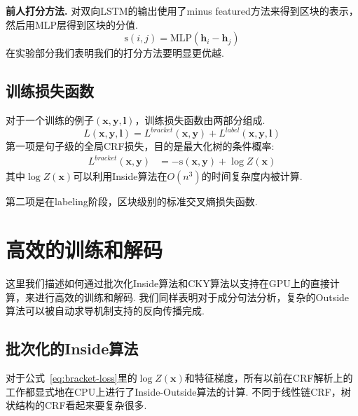 \noindent\textbf{前人打分方法.}
\cite{stern-etal-2017-minimal}对双向LSTM的输出使用了minus featured方法来得到区块的表示\cite{wang-chang-2016-graph,cross-huang-2016-span}，然后用MLP层得到区块的分值.
\begin{equation} \label{eq:minus-score}
    \mathrm{s}(i,j)=\mathrm{MLP}(\mathbf{h}_{i}-\mathbf{h}_{j})
\end{equation}
在实验部分我们表明我们的打分方法要明显更优越.

\subsection{训练损失函数}

对于一个训练的例子$(\boldsymbol{x},\boldsymbol{y},\boldsymbol{l})$，训练损失函数由两部分组成.
\begin{equation} \label{eq:final-loss}
    \mathit{L(\boldsymbol{x}, \boldsymbol{y}, \boldsymbol{l})} = \mathit{L}^{bracket}(\boldsymbol{x}, \boldsymbol{y}) + \mathit{L}^{label}(\boldsymbol{x}, \boldsymbol{y}, \boldsymbol{l})
\end{equation}
第一项是句子级的全局CRF损失，目的是最大化树的条件概率:
\begin{equation}\label{eq:bracket-loss}
    \begin{split}
        \mathit{L}^{bracket}(\boldsymbol{x},\boldsymbol{y})
        &= -\mathrm{s}(\boldsymbol{x}, \boldsymbol{y}) + \log Z(\boldsymbol{x})
    \end{split}
\end{equation}
其中$\log Z(\boldsymbol{x})$可以利用Inside算法在$O(n^3)$的时间复杂度内被计算.

第二项是在labeling阶段，区块级别的标准交叉熵损失函数.

\section{高效的训练和解码}
\label{sec:efficient-training-decoding}



这里我们描述如何通过批次化Inside算法和CKY算法以支持在GPU上的直接计算，来进行高效的训练和解码.
我们同样表明对于成分句法分析，复杂的Outside算法可以被自动求导机制支持的反向传播完成.

\subsection{批次化的Inside算法}

对于公式~\ref{eq:bracket-loss}里的$\log Z(\boldsymbol{x})$和特征梯度，所有以前在CRF解析上的工作\cite{finkel-etal-2008-efficient,durrett-klein-2015-neural}都显式地在CPU上进行了Inside-Outside算法的计算.
不同于线性链CRF，树状结构的CRF看起来要复杂很多.

